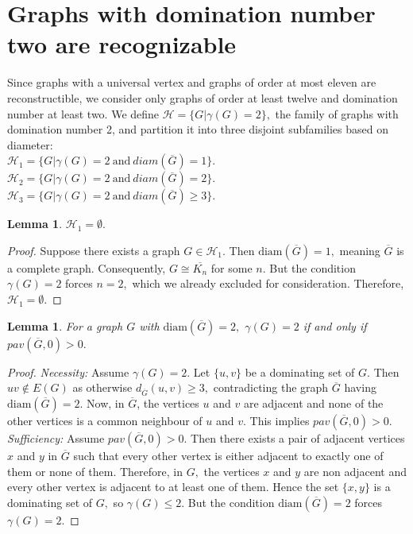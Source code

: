 \documentclass[11pt,oneside]{article}
\newtheorem{lem}[thm]{Lemma}
\theoremstyle{definition}
\begin{document}
\section{{ Graphs with domination number two are recognizable}}
 \indent \indent Since graphs with a universal vertex and graphs of order at most eleven are reconstructible, we consider only graphs of order at least twelve and domination number at least two. We define $\mathscr{H}=\{G| \gamma(G)=2\},$ the family of graphs with domination number 2, and partition it into three disjoint subfamilies based on diameter: \\
$\mathscr{H}_1=\{G| \gamma(G)=2 ~ \text{and} ~ diam(\overline{G}) = 1\}.$\\
 $\mathscr{H}_2=\{G| \gamma(G)=2 ~ \text{and} ~ diam(\overline{G}) = 2\}.$\\
 $\mathscr{H}_3=\{G| \gamma(G)=2 ~ \text{and} ~ diam(\overline{G}) \geq 3\}.$

{ \begin{lem}\label{l1}
$\mathscr{H}_1 = \emptyset.$
\end{lem}
\begin{proof}
Suppose there exists a graph $G \in \mathscr{H}_1.$ Then $\text{diam}(\overline{G})=1,$ meaning $\overline{G}$ is a complete graph. Consequently, $G \cong \overline{K_n}$ for some $n.$ But the condition $\gamma(G)=2$ forces $n=2,$ which we already excluded for consideration. Therefore, $\mathscr{H}_1 = \emptyset.$ 
\end{proof}}


\begin{lem}\label{2}
For a graph  $G$  with $\text{diam}(\overline{G})=2,$  $\gamma(G)=2$ if and only if $pav(\overline{G},0)>0.$
\end{lem}
\begin{proof}
{\it Necessity:} Assume $\gamma(G)=2.$ Let $\{u, v\}$ be a dominating set of $G$. Then $uv \notin E(G)$ as otherwise  $d_{\overline{G}}(u,v) \geq 3,$  contradicting the graph $\overline{G}$ having $\text{diam}(\overline{G})=2.$ Now, in $\overline{G}$, the vertices $u$ and $v$ are adjacent and none of the other vertices is a common neighbour of $u$ and $v$.   
This implies $pav(\overline{G},0)>0.$\\
{\it Sufficiency:} Assume $pav(\overline{G},0)>0.$ Then there exists a pair of adjacent vertices $x$ and $y$ in $\overline{G}$ such that every other vertex is either adjacent to exactly one of them or none of them. Therefore, in $G,$ the vertices $x$ and $y$ are non adjacent  and every other vertex is adjacent to at least one of them. Hence the set $\{x, y\}$ is a dominating set of  $G,$ so $\gamma(G)\leq 2.$ But the condition $\text{diam}(\overline{G})=2$  forces $\gamma(G)= 2.$
\end{proof}
\end{document}
